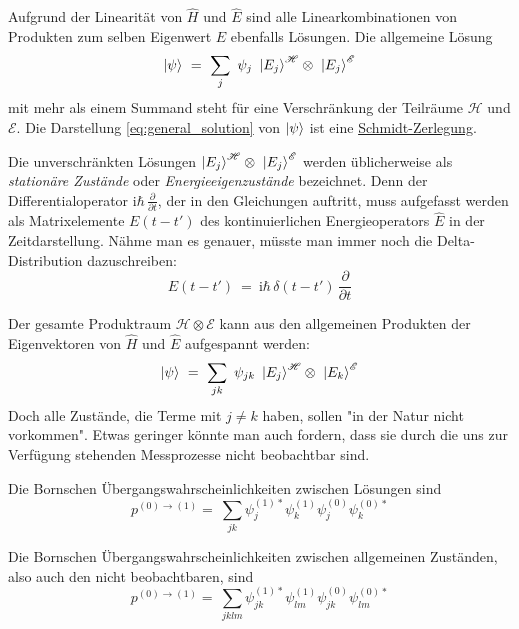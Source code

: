 \documentclass[12pt]{article}
\begin{document}
Aufgrund der Linearität von $\hat{H}$ und $\hat{E}$ sind alle Linearkombinationen von Produkten zum selben Eigenwert $E$ ebenfalls Lösungen. Die allgemeine Lösung
\begin{equation}
\label{eq:general_solution}
\ket{\psi}\ =\ \sum_j\ \psi_j\ \ket{{E_j}}^{\mathscr{H}} \otimes\ \ket{{E_j}}^{\mathscr{E}}
\end{equation}
mit mehr als einem Summand steht für eine Verschränkung der Teilräume $\mathscr{H}$ und $\mathscr{E}$. Die Darstellung \eqref{eq:general_solution} von $\ket{\psi}$ ist eine \href{https://en.wikipedia.org/wiki/Schmidt_decomposition}{Schmidt-Zerlegung}.

Die unverschränkten Lösungen $\ket{{E_j}}^{\mathscr{H}} \otimes\ \ket{{E_j}}^{\mathscr{E}}$ werden üblicherweise als \emph{stationäre Zustände} oder \emph{Energieeigenzustände} bezeichnet. Denn der Differentialoperator $\mathrm{i}\hbar\,\frac{\partial}{\partial t}$, der in den Gleichungen auftritt, muss aufgefasst werden als Matrixelemente $E(t-t')$ des kontinuierlichen Energieoperators $\hat{E}$ in der Zeitdarstellung. Nähme man es genauer, müsste man immer noch die Delta-Distribution dazuschreiben: 
\begin{equation*}
E(t-t')\ =\ \mathrm{i}\hbar\,\delta(t-t')\,\frac{\partial}{\partial t}
\end{equation*}

Der gesamte Produktraum $\mathscr{H} \otimes \mathscr{E}$ kann aus den allgemeinen Produkten der Eigenvektoren von $\hat{H}$ und $\hat{E}$ aufgespannt werden:
\begin{equation}
\label{eq:general_state}
\ket{\psi}\ =\ \sum_{jk}\ \psi_{jk}\ \ket{{E_j}}^{\mathscr{H}} \otimes\ \ket{{E_k}}^{\mathscr{E}}
\end{equation}
Doch alle Zustände, die Terme mit $j \neq k$ haben, sollen "in der Natur nicht vorkommen". Etwas geringer könnte man auch fordern, dass sie durch die uns zur Verfügung stehenden Messprozesse nicht beobachtbar sind.

Die Bornschen Übergangswahrscheinlichkeiten zwischen Lösungen sind
\begin{equation} 
p^{(0)\rightarrow(1)} =\ \sum_{jk} \psi_j^{(1)*}\psi_k^{(1)}\psi_j^{(0)}\psi_k^{(0)*}
\end{equation}

Die Bornschen Übergangswahrscheinlichkeiten zwischen allgemeinen Zuständen, also auch den nicht beobachtbaren, sind
\begin{equation} 
p^{(0)\rightarrow(1)} =\ \sum_{jklm} \psi_{jk}^{(1)*}\psi_{lm}^{(1)}\psi_{jk}^{(0)}\psi_{lm}^{(0)*}
\end{equation}
\end{document}
